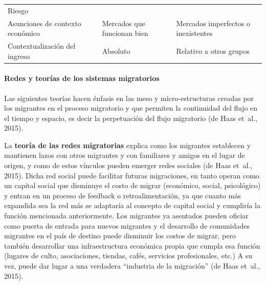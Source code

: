 \documentclass[12pt,spanish,]{article}
\let\oldparagraph\paragraph
\renewcommand{\paragraph}[1]{\oldparagraph{#1}\mbox{}}
\begin{document}
\begin{longtable}[]{@{}lll@{}}
\begin{minipage}[t]{0.32\columnwidth}
Riesgo\strut
\end{minipage}\tabularnewline
\begin{minipage}[t]{0.34\columnwidth}\raggedright
Asunciones de contexto económico\strut
\end{minipage} & \begin{minipage}[t]{0.25\columnwidth}\raggedright
Mercados que funcionan bien\strut
\end{minipage} & \begin{minipage}[t]{0.32\columnwidth}\raggedright
Mercados imperfectos o inexistentes\strut
\end{minipage}\tabularnewline
\begin{minipage}[t]{0.34\columnwidth}\raggedright
Contextualización del ingreso\strut
\end{minipage} & \begin{minipage}[t]{0.25\columnwidth}\raggedright
Absoluto\strut
\end{minipage} & \begin{minipage}[t]{0.32\columnwidth}\raggedright
Relativo a otros grupos\strut
\end{minipage}\tabularnewline
\bottomrule
\end{longtable}

\hypertarget{redes-y-teoruxedas-de-los-sistemas-migratorios}{%
\paragraph{Redes y teorías de los sistemas
migratorios}\label{redes-y-teoruxedas-de-los-sistemas-migratorios}}

Las siguientes teorías hacen énfasis en las meso y micro-estructuras
creadas por los migrantes en el proceso migratorio y que permiten la
continuidad del flujo en el tiempo y espacio, es decir la perpetuación
del flujo migratorio (de Haas et~al., 2015).

La \textbf{teoría de las redes migratorias} explica como los migrantes
establecen y mantienen lazos con otros migrantes y con familiares y
amigos en el lugar de origen, y como de estos vínculos pueden emerger
redes sociales (de Haas et~al., 2015). Dicha red social puede facilitar
futuras migraciones, en tanto operan como un capital social que
disminuye el costo de migrar (económico, social, psicológico) y entran
en un proceso de feedback o retroalimentación, ya que cuanto más
expandida sea la red más se adaptaría al concepto de capital social y
cumpliría la función mencionada anteriormente. Los migrantes ya
asentados pueden oficiar como puerta de entrada para nuevos migrantes y
el desarrollo de comunidades migrantes en el país de destino puede
disminuir los costos de migrar, pero también desarrollar una
infraestructura económica propia que cumpla esa función (lugares de
culto, asociaciones, tiendas, cafés, servicios profesionales, etc.) A su
vez, puede dar lugar a una verdadera ``industria de la migración'' (de
Haas et~al., 2015).
\end{document}
